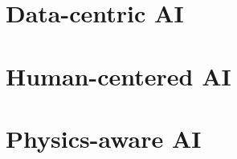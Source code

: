 \documentclass[a4paper,12pt,times,print,authoryear,index]{Classes/PhDThesisPSnPDF}
\begin{document}
\frontmatter

% 
\newpage
% 

% 



\tableofcontents

\mainmatter
\sloppy
% 








\part{Data-centric AI}\label{part:data-centric}





\part{Human-centered AI}\label{part:human-centric}
% 





\part{Physics-aware AI}\label{part:physics-aware}
% 



% 







\end{document}

